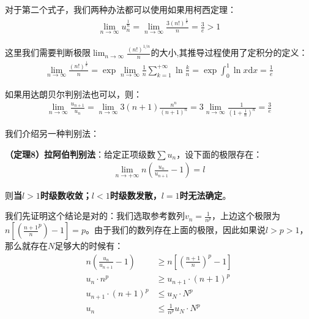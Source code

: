 \documentclass{ctexart}
\let\oldtextbf\textbf
\renewcommand{\textbf}[1]{\textcolor{brown!50!red}{\oldtextbf{#1}}}
\begin{document}
对于第二个式子，我们两种办法都可以使用如果用柯西定理：
\begin{align*}
   \lim_{n\to\infty}u_n^{\frac{1}{n}}=\lim_{n\to\infty}\frac{3(n!)^{\frac{1}{n} }}{n}
=\frac{3}{e}>1 
\end{align*}

这里我们需要判断极限$\lim_{n\to\infty}\frac{(n!)^{1/n}}{n}$的大小,其推导过程使用了定积分的定义：
\begin{align*}
   \lim_{n\to\infty}\frac{(n!)^{\frac{1}{n} }}{n}=\exp{\lim_{n\to\infty}\frac{1}{n}
\sum _{k=1}^{+\infty}\ln{\frac{k}{n}}}=\exp{\int_0^1\ln x\mathrm{d}x}=\frac{1}{e} 
\end{align*}
\begin{tcolorbox}[
    colback=bac1,     %
    colframe=fra1,   %
    coltitle=white!80,    
    coltext=tex1,%
    title=另一种办法,
    fonttitle=\bfseries,        %
arc=2mm,                     %
breakable
]
如果用达朗贝尔判别法也可以，则：
\begin{align*}
   \lim_{n\to\infty}\frac{u_{n+1}}{u_{n}}=\lim_{n\to\infty}3(n+1)\frac{n^n}{(n+1)^n}
=3\lim_{n\to\infty}\frac{1}{(1+\frac{1}{n})^n }=\frac{3}{e}  
\end{align*}
\end{tcolorbox}

我们介绍另一种判别法：
\begin{tcolorbox}[
    colback=bac2,     %
    colframe=fra2,   %
    coltitle=white,             %
    coltext=tex2,
    title=拉阿伯判别法,
    fonttitle=\bfseries,        %
arc=3mm,                     %
breakable
]

\textbf{\color{brown!50!red}（定理8）拉阿伯判别法}：给定正项级数$\sum u_n$，设下面的极限存在：
\begin{align*}
    \lim_{n\to+\infty}n(\frac{u_n}{u_{n+1}}-1)=l
    \end{align*}

则\textbf{\color{brown!50!red}当$l>1$时级数收敛；$l<1$时级数发散，$l=1$时无法确定}。
\end{tcolorbox}


我们先证明这个结论是对的：我们选取参考数列$v_n=\frac{1}{n^p}$，上边这个极限为$n[(\frac{n+1}{n}^p)-1]=p$。由于我们的数列存在上面的极限，因此如果说$l>p>1$，那么就存在$N$足够大的时候有：
\begin{align*}
   n(\frac{u_n}{u_{n+1}}-1)&\geq n[(\frac{n+1}{n})^p-1]\\
u_n\cdot n^p&\geq u_{n+1}\cdot (n+1)^p\\
u_{n+1}\cdot (n+1)^p&\leq u_N\cdot N^p\\
u_n&\leq \frac{1}{n^p}u_N\cdot N^p     
\end{align*}
\end{document}

